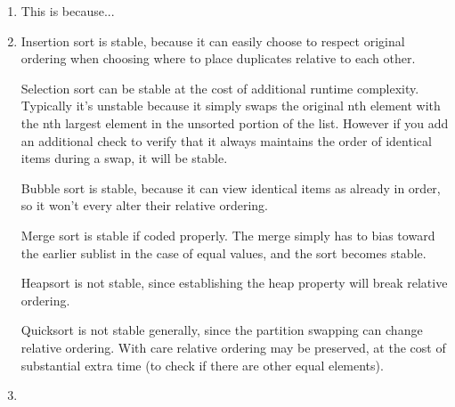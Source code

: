 \documentclass[12pt]{chmullighw}
\begin{document}
\begin{enumerate}
\item This is  because... 

\item Insertion sort is stable, because it can easily choose to respect original
ordering when choosing where to place duplicates relative to each other.

Selection sort can be stable at the cost of additional runtime complexity. Typically
it's unstable because it simply swaps the original nth element with the nth
largest element in the unsorted portion of the list. However if you add an
additional check to verify that it always maintains the order of identical items
during a swap, it will be stable.

Bubble sort is stable, because it can view identical items as already in order,
so it won't every alter their relative ordering.

Merge sort is stable if coded properly. The merge simply has to bias toward the
earlier sublist in the case of equal values, and the sort becomes stable.

Heapsort is not stable, since establishing the heap property will break relative
ordering.

Quicksort is not stable generally, since the partition swapping can change
relative ordering. With care relative ordering may be preserved, at the cost of
substantial extra time (to check if there are other equal elements). 

\item 
\end{enumerate} %
\end{document}
